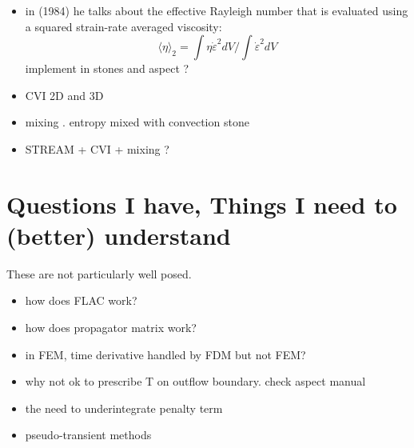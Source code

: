 \documentclass[a4paper]{article}
\begin{document}
\begin{itemize}
\item in \textcite{chri84} (1984) he talks about the effective Rayleigh number 
that is evaluated using a squared strain-rate averaged viscosity:
\[
\langle \eta \rangle_2 = \int \eta \dot{\varepsilon}^2 dV/\int \dot{\varepsilon}^2 dV
\]
implement in stones and aspect ?

\item CVI 2D and 3D

\item mixing . entropy mixed with convection stone

\item STREAM + CVI + mixing ?

\end{itemize}

\newpage
\section{Questions I have, Things I need to (better) understand}

These are not particularly well posed. 

\begin{itemize}
\item how does FLAC work?
\item how does propagator matrix work?
\item in FEM, time derivative handled by FDM but not FEM?
\item why not ok to prescribe T on outflow boundary. check aspect manual
\item the need to underintegrate penalty term
\item pseudo-transient methods
\end{itemize}
\end{document}
